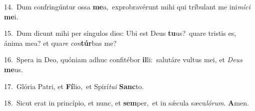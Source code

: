{\numbfont\textcolor{\numbcolor}{14.}}~Dum confringúntur ossa \textbf{me}\-a,~\star exprobravérunt mihi qui tríbulant me ini\-\textit{mí}\-\textit{ci} \textbf{me}\-i.\par
{\numbfont\textcolor{\numbcolor}{15.}}~Dum dicunt mihi per síngulos dies: Ubi est Deus \textbf{tu}\-us?~\star quare tristis es, ánima mea? et qua\textit{re} \textit{con}\-\textbf{túr}bas me?\par
{\numbfont\textcolor{\numbcolor}{16.}}~Spera in Deo, quóniam adhuc confitébor \textbf{il}\-li:~\star salutáre vultus mei, et \textit{De}\-\textit{us} \textbf{me}\-us.\par
{\numbfont\textcolor{\numbcolor}{17.}}~Glória Patri, et \textbf{Fí}\-lio,~\star et Spirí\-\textit{tu}\-\textit{i} \textbf{Sanc}\-to.\par
{\numbfont\textcolor{\numbcolor}{18.}}~Sicut erat in princípio, et nunc, et \textbf{sem}\-per,~\star et in sǽcula sæcu\-\textit{ló}\-\textit{rum}. \textbf{A}\-men.\par
